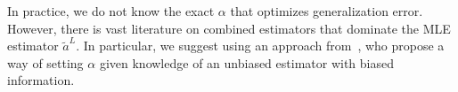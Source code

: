 In practice, we do not know the exact $\alpha$ that optimizes generalization error. However, there is vast literature on combined estimators that dominate the MLE estimator $\widetilde{a}^L$. In particular, we suggest using an approach from~\cite{GreenStrawderman2001}, who propose a way of setting $\alpha$ given knowledge of an unbiased estimator with biased information. %


